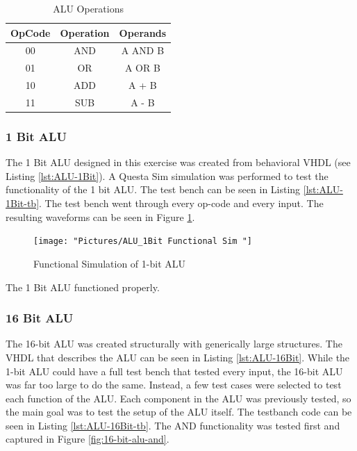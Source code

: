 \documentclass[11pt]{article}
\begin{document}
		\begin{table}[H]
			\centering
			\caption{ALU Operations}
			\label{tab:OpCodes}
			\begin{tabular}{|ccc|}
				\hline
				\textbf{OpCode} & \textbf{Operation} & \textbf{Operands} \\
				\hline
				00              & AND                & A AND B           \\
				01              & OR                 & A OR B            \\
				10              & ADD                & A + B             \\
				11              & SUB                & A - B   \\   
				\hline       
			\end{tabular}
		\end{table}
	
		\subsubsection{1 Bit ALU}
		
			The 1 Bit ALU designed in this exercise was created from behavioral VHDL (see Listing \ref{lst:ALU-1Bit}). A Questa Sim simulation was performed to test the functionality of the 1 bit ALU. The test bench can be seen in Listing \ref{lst:ALU-1Bit-tb}. The test bench went through every op-code and every input. The resulting waveforms can be seen in Figure \ref{fig:alu1bit-functional-sim-}.
		
			\begin{figure}[H]
				\centering
				\texttt{[image: "Pictures/ALU\_1Bit Functional Sim "]}
				\caption{Functional Simulation of 1-bit ALU}
				\label{fig:alu1bit-functional-sim-}
			\end{figure}
		
			The 1 Bit ALU functioned properly.
		
		\subsubsection{16 Bit ALU}
		
			The 16-bit ALU was created structurally with generically large structures. The VHDL that describes the ALU can be seen in Listing \ref{lst:ALU-16Bit}. While the 1-bit ALU could have a full test bench that tested every input, the 16-bit ALU was far too large to do the same. Instead, a few test cases were selected to test each function of the ALU. Each component in the ALU was previously tested, so the main goal was to test the setup of the ALU itself. The testbanch code can be seen in Listing \ref{lst:ALU-16Bit-tb}. The AND functionality was tested first and captured in Figure \ref{fig:16-bit-alu-and}.
		
\end{document}
